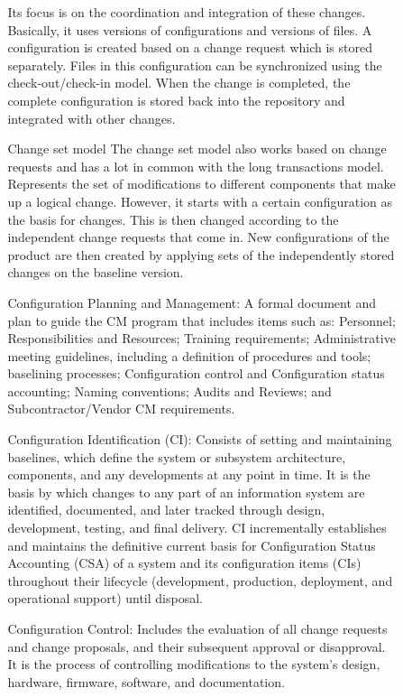 \documentclass{article}
\begin{document}
\begin{itemize}
\begin{itemize}
\begin{itemize}
    Its focus is on the coordination and integration of these changes. Basically, it uses versions of configurations and versions of files.
    A configuration is created based on a change request which is stored separately. Files in this configuration can be synchronized using the check-out/check-in model.
    When the change is completed, the complete configuration is stored back into the repository and integrated with other changes.
    \item[Change set model]
    The change set model also works based on change requests and has a lot in common with the long transactions model. Represents the set of modifications to different components that make up a logical change.
    However, it starts with a certain configuration as the basis for changes. This is then changed according to the independent change requests that come in.
    New configurations of the product are then created by applying sets of the independently stored changes on the baseline version.
    \end{itemize}
    \begin{itemize}
    \item [Configuration Planning and Management:] A formal document and plan to guide the CM program that includes items such as:
    Personnel; Responsibilities and Resources; Training requirements; Administrative meeting guidelines, including a definition of procedures and tools;
    baselining processes; Configuration control and Configuration status accounting; Naming conventions; Audits and Reviews; and Subcontractor/Vendor CM requirements.
    \item [Configuration Identification (CI):] Consists of setting and maintaining baselines, which define the system or subsystem architecture,
    components, and any developments at any point in time. It is the basis by which changes to any part of an information system are identified, documented,
    and later tracked through design, development, testing, and final delivery. CI incrementally establishes and maintains the definitive current basis for Configuration Status Accounting (CSA)
    of a system and its configuration items (CIs) throughout their lifecycle (development, production, deployment, and operational support) until disposal.
    \item[Configuration Control:] Includes the evaluation of all change requests and change proposals, and their subsequent approval or disapproval.
    It is the process of controlling modifications to the system's design, hardware, firmware, software, and documentation.

\end{itemize}
\end{itemize}
\end{itemize}
\end{document}
